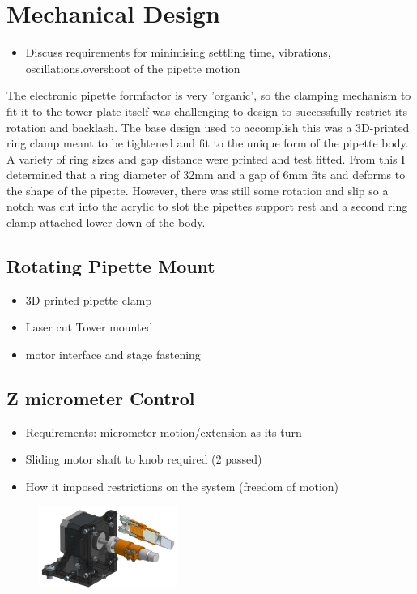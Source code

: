 \section{Mechanical Design}

\begin{itemize}
    \item Discuss requirements for minimising settling time, vibrations, oscillations.overshoot of the pipette motion 
\end{itemize}

The electronic pipette formfactor is very 'organic', so the clamping mechanism to fit it to the tower plate itself was challenging to design to successfully restrict its rotation and backlash.  
The base design used to accomplish this was a 3D-printed ring clamp meant to be tightened and fit to the unique form of the pipette body. A variety of ring sizes and gap distance were printed and test fitted. From this I determined that a ring diameter of 32mm and a gap of 6mm fits and deforms to the shape of the pipette. However, there was still some rotation and slip so a notch was cut into the acrylic to slot the pipettes support rest and a second ring clamp attached lower down of the body. 


\subsection{Rotating Pipette Mount}

\begin{itemize}
    \item 3D printed pipette clamp
    \item Laser cut Tower mounted
    \item motor interface and stage fastening  
\end{itemize}

\subsection{Z micrometer Control}
\begin{itemize}
    \item Requirements: micrometer motion/extension as its turn
    \item Sliding motor shaft to knob required (2 passed)
    \item How it imposed restrictions on the system (freedom of motion)  
\end{itemize}

\begin{figure}[h]
    \centering
    \includegraphics[width=0.4\textwidth]{img/z_control.png}
\end{figure}

